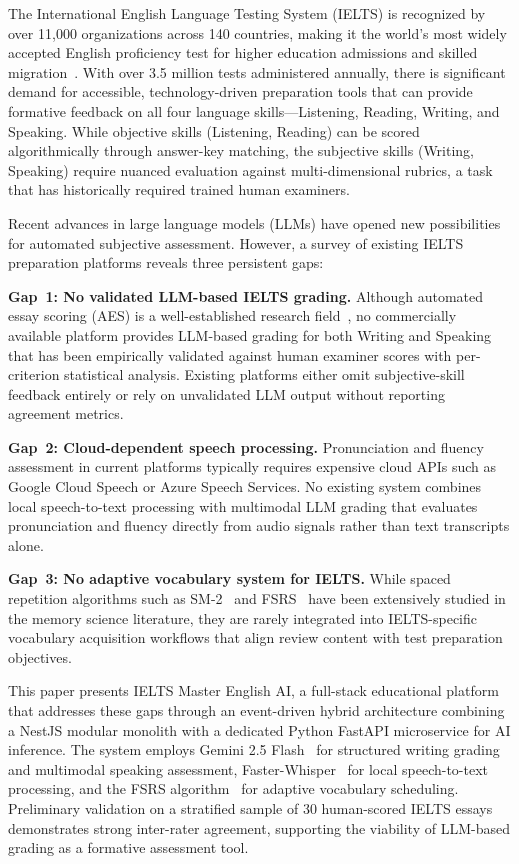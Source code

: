 \documentclass[conference]{IEEEtran}
\begin{document}
The International English Language Testing System (IELTS) is recognized by over 11{,}000 organizations across 140 countries, making it the world's most widely accepted English proficiency test for higher education admissions and skilled migration~\cite{ielts_stats}. With over 3.5 million tests administered annually, there is significant demand for accessible, technology-driven preparation tools that can provide formative feedback on all four language skills---Listening, Reading, Writing, and Speaking. While objective skills (Listening, Reading) can be scored algorithmically through answer-key matching, the subjective skills (Writing, Speaking) require nuanced evaluation against multi-dimensional rubrics, a task that has historically required trained human examiners.

Recent advances in large language models (LLMs) have opened new possibilities for automated subjective assessment. However, a survey of existing IELTS preparation platforms reveals three persistent gaps:

\textbf{Gap~1: No validated LLM-based IELTS grading.} Although automated essay scoring (AES) is a well-established research field~\cite{erater,aes_handbook}, no commercially available platform provides LLM-based grading for both Writing and Speaking that has been empirically validated against human examiner scores with per-criterion statistical analysis. Existing platforms either omit subjective-skill feedback entirely or rely on unvalidated LLM output without reporting agreement metrics.

\textbf{Gap~2: Cloud-dependent speech processing.} Pronunciation and fluency assessment in current platforms typically requires expensive cloud APIs such as Google Cloud Speech or Azure Speech Services. No existing system combines local speech-to-text processing with multimodal LLM grading that evaluates pronunciation and fluency directly from audio signals rather than text transcripts alone.

\textbf{Gap~3: No adaptive vocabulary system for IELTS.} While spaced repetition algorithms such as SM-2~\cite{sm2} and FSRS~\cite{fsrs} have been extensively studied in the memory science literature, they are rarely integrated into IELTS-specific vocabulary acquisition workflows that align review content with test preparation objectives.

This paper presents IELTS Master English AI, a full-stack educational platform that addresses these gaps through an event-driven hybrid architecture combining a NestJS modular monolith with a dedicated Python FastAPI microservice for AI inference. The system employs Gemini 2.5 Flash~\cite{gemini} for structured writing grading and multimodal speaking assessment, Faster-Whisper~\cite{faster_whisper} for local speech-to-text processing, and the FSRS algorithm~\cite{fsrs} for adaptive vocabulary scheduling. Preliminary validation on a stratified sample of 30 human-scored IELTS essays demonstrates strong inter-rater agreement, supporting the viability of LLM-based grading as a formative assessment tool.
\end{document}
